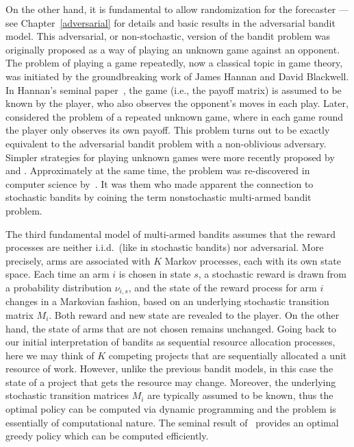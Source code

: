 \documentclass[11pt]{hackednow}
\begin{document}
On the other hand, it is fundamental to allow randomization for the forecaster ---see Chapter~\ref{adversarial} for details and basic results in the adversarial bandit model.
This adversarial, or non-stochastic, version of the bandit problem was originally proposed as a way of playing an unknown game against an opponent. The problem of playing a game repeatedly, now a classical topic in game theory, was initiated by the groundbreaking work of James Hannan and David Blackwell. In Hannan's seminal paper~\cite{Han57}, the game (i.e., the payoff matrix) is assumed to be known by the player, who also observes the opponent's moves in each play. Later, \cite{Ban68} considered the problem of a repeated unknown game, where in each game round the player only observes its own payoff. This problem turns out to be exactly equivalent to the adversarial bandit problem with a non-oblivious adversary. Simpler strategies for playing unknown games were more recently proposed by \cite{FoVo98} and \cite{HaMa99,HaMa00}. Approximately at the same time, the problem was re-discovered in computer science by~\cite{ACFS03}. It was them who made apparent the connection to stochastic bandits by coining the term nonstochastic multi-armed bandit problem. 

The third fundamental model of multi-armed bandits assumes that the reward processes are neither i.i.d.\ (like in stochastic bandits) nor adversarial. More precisely, arms are associated with $K$ Markov processes, each with its own state space. Each time an arm $i$ is chosen in state $s$, a stochastic reward is drawn from a probability distribution $\nu_{i,s}$, and the state of the reward process for arm $i$ changes in a Markovian fashion, based on an underlying stochastic transition matrix $M_i$. Both reward and new state are revealed to the player. On the other hand, the state of arms that are not chosen remains unchanged. Going back to our initial interpretation of bandits as sequential resource allocation processes, here we may think of $K$ competing projects that are sequentially allocated a unit resource of work. However, unlike the previous bandit models, in this case the state of a project that gets the resource may change. Moreover, the underlying stochastic transition matrices $M_i$ are typically assumed to be known, thus the optimal policy can be computed via dynamic programming and the problem is essentially of computational nature. The seminal result of~\cite{gittins1979bandit} provides an optimal greedy policy which can be computed efficiently.
\end{document}
